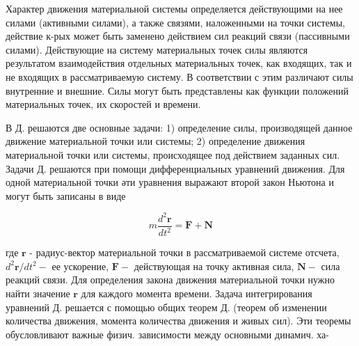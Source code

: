 \documentclass[10pt]{article}
\begin{document}
Характер движения материальной системы определяется действующими на нее силами (активными силами), а также связями, наложенными на точки системы, действие к-рых может быть заменено действием сил реакций связи (пассивными силами). Действующие на систему материальных точек силы являются результатом взаимодействия отдельных материальных точек, как входящих, так и не входящих в рассматриваемую систему. В соответствии с этим различают силы внутренние и внешние. Силы могут быть представлены как функции положений материальных точек, их скоростей и времени.



В Д. решаются две основные задачи: 1) определение силы, производящей данное движение материальной точки или системы; 2) определение движения материальной точки или системы, происходящее под действием заданных сил. Задачи Д. решаются при помощи дифференциальных уравнений движения. Для одной материальной точки әти уравнения выражают второй закон Ньютона и могут быть записаны в виде



\[

m \frac{d^{2} \boldsymbol{r}}{d t^{2}}=\boldsymbol{F}+\boldsymbol{N}

\]



где $\boldsymbol{r}$ - радиус-вектор материальной точки в рассматриваемой системе отсчета, $d^{2} \boldsymbol{r} / d t^{2}-$ ее ускорение, $\boldsymbol{F}-$ действующая на точку активная сила, $\boldsymbol{N}-$ сила реакций связи. Для определения закона движения материальной точки нужно найти значение $\boldsymbol{r}$ для каждого момента времени. Задача интегрирования уравнений Д. решается с помощью общих теорем Д. (теорем об изменении количества движения, момента количества движения и живых сил). Эти теоремы обусловливают важные физич. зависимости между основными динамич. ха-
\end{document}

